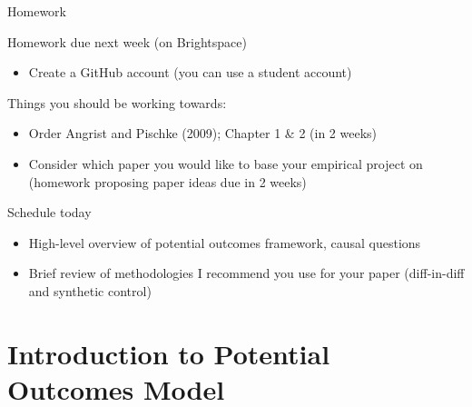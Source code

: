 \documentclass[compress, 8pt]{beamer}
\begin{document}
\begin{frame}{Homework}

Homework due next week (on Brightspace)
\begin{itemize}
    \item Create a GitHub account (you can use a student account)
\end{itemize}

Things you should be working towards:
\begin{itemize}
    \item Order Angrist and Pischke (2009); Chapter 1 \& 2 (in 2 weeks)
    \item Consider which paper you would like to base your empirical project on (homework proposing paper ideas due in 2 weeks)
    
\end{itemize}

\end{frame}


\begin{frame}{Schedule today}
\begin{itemize}
    \item High-level overview of potential outcomes framework, causal questions
    \item Brief review of methodologies I recommend you use for your paper (diff-in-diff and synthetic control)
\end{itemize}
\end{frame}

\section[Intro Potential Outcomes]{Introduction to Potential Outcomes Model}
\miniframesoff
\begin{frame}
    \tableofcontents[currentsection]
\end{frame}
\miniframeson
\end{document}
